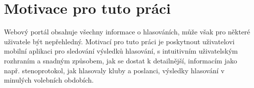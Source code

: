 \section{Motivace pro tuto práci}
Webový portál obsahuje všechny informace o hlasováních, může však pro některé uživatele být nepřehledný. Motivací pro tuto práci je poskytnout uživatelovi mobilní aplikaci pro sledování výsledků hlasování, s intuitivním uživatelským rozhraním a snadným způsobem, jak se dostat k detailnější, informacím jako např. stenoprotokol, jak hlasovaly kluby a poslanci, výsledky hlasování v minulých volebních obdobích.